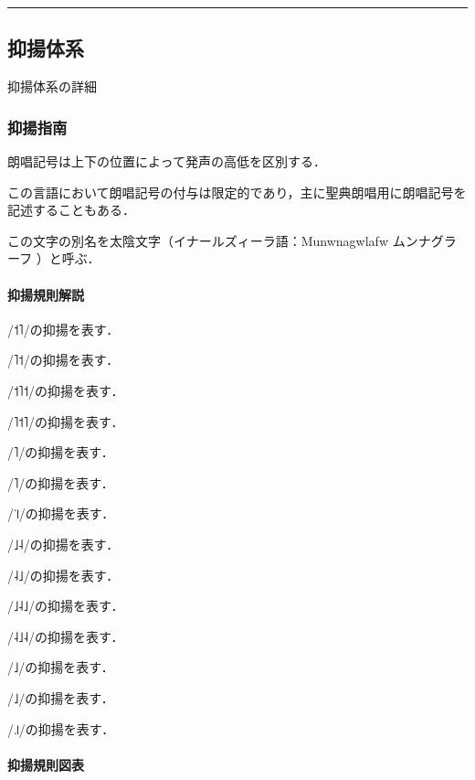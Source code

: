 \documentclass[
  japanese,
]{article}
\providecommand{\tightlist}{%
  \setlength{\itemsep}{0pt}\setlength{\parskip}{0pt}}
\begin{document}
\begin{center}\rule{0.5\linewidth}{0.5pt}\end{center}

\subsection{抑揚体系}\label{chapter2}

抑揚体系の詳細

\subsubsection{抑揚指南}\label{section2.1}

\protect{}\label{cantillation-symbol}{朗唱記号}は上下の位置によって発声の高低を区別する．

この言語において朗唱記号の付与は限定的であり，主に聖典朗唱用に朗唱記号を記述することもある．

この文字の別名を太陰文字（イナールズィーラ語：{Munwnagwlafw}
ムンナグラーフ ）と呼ぶ．

\paragraph{抑揚規則解説}\label{subsection2.1.1}

\begin{description}
\tightlist
\item[{◌́}]
/{˦˥}/の抑揚を表す．
\item[{◌̀}]
/{˥˦}/の抑揚を表す．
\item[{◌̂}]
/{˦˥˦}/の抑揚を表す．
\item[{◌̌}]
/{˥˦˥}/の抑揚を表す．
\item[{◌̄}]
/{˥}/の抑揚を表す．
\item[{◌̈}]
/{˥}/の抑揚を表す．
\item[{◌̇}]
/{꜈}/の抑揚を表す．
\item[{◌̗}]
/{˩˨}/の抑揚を表す．
\item[{◌̖}]
/{˨˩}/の抑揚を表す．
\item[{◌̭}]
/{˩˨˩}/の抑揚を表す．
\item[{◌̬}]
/{˨˩˨}/の抑揚を表す．
\item[{◌̱}]
/{˩}/の抑揚を表す．
\item[{◌̤}]
/{˩}/の抑揚を表す．
\item[{◌̣}]
/{꜌}/の抑揚を表す．
\end{description}

\paragraph{抑揚規則図表}\label{subsection2.1.2}
\end{document}

